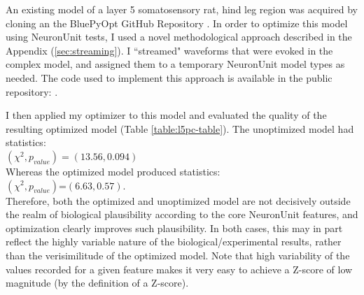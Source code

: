 

An existing model of a layer 5 somatosensory rat, hind leg region was acquired by cloning an the BluePyOpt GitHub Repository \citep{van2016bluepyopt}.
In order to optimize this model using NeuronUnit tests, I used a novel methodological approach described in the Appendix (\ref{sec:streaming}). I ``streamed" waveforms that were evoked in the complex model, and assigned them to a temporary  NeuronUnit model types as needed. The code used to implement this approach is available in the public repository: \citep{l5pcnu}. 

I then applied my optimizer to this model and evaluated the quality of the resulting optimized model (Table \ref{table:l5pc-table}).
The unoptimized model had statistics:\\
$(\chi^{2},p_{value})=(13.56, 0.094)$\\
Whereas the optimized model produced statistics:\\
$(\chi^{2},p_{value})$=$(6.63, 0.57)$.\\
Therefore, both the optimized and unoptimized model are not decisively outside the realm of biological plausibility according to the core NeuronUnit features, and optimization clearly improves such plausibility.
In both cases, this may in part reflect the highly variable nature of the biological/experimental results, rather than the verisimilitude of the optimized model.
Note that high variability of the values recorded for a given feature makes it very easy to achieve a Z-score of low magnitude (by the definition of a Z-score).

